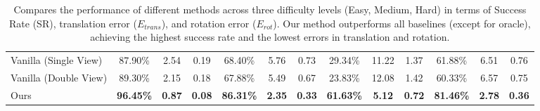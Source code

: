 \begin{table*}[htbp]
{\begin{tabular}{l|ccc|ccc|ccc|ccc}
    Vanilla (Single View)                   &      87.90\%             &    2.54              &    0.19            &     68.40\%              &      5.76            &     0.73           &               29.34\%       &    11.22           &     1.37     &              61.88\%       &    6.51           &     0.76       \\
    Vanilla (Double View)                   &      89.30\%             &    2.15              &    0.18            &     67.88\%              &     5.49             &    0.67            &              23.83\%     &      12.08            &    1.42     &              60.33\%     &      6.57            &    0.75             \\
    \rowcolor[rgb]{0.8,0.949,0.961} Ours  &  \textbf{96.45\%}            &    \textbf{0.87}           &  \textbf{0.08}           &    \textbf{86.31\%}               &     \textbf{2.35}             &     \textbf{0.33}           &   \textbf{61.63\%}                &    \textbf{5.12}              &    \textbf{0.72}   &   \textbf{81.46\%}                &    \textbf{2.78}              &    \textbf{0.36}           \\
    \bottomrule
    \end{tabular}
}

\caption{Compares the performance of different methods across three difficulty levels (Easy, Medium, Hard) in terms of Success Rate (SR), translation error ($E_{trans}$), and rotation error ($E_{rot}$). Our method outperforms all baselines (except for oracle), achieving the highest success rate and the lowest errors in translation and rotation.}  
\label{tab:main}
\end{table*}

